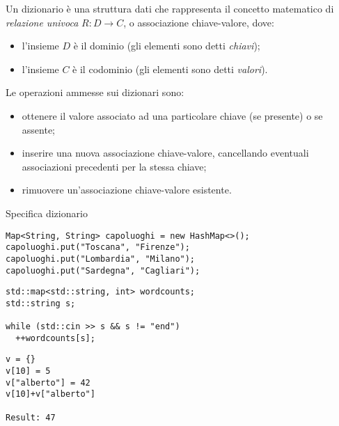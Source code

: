 Un dizionario è una struttura dati che rappresenta il concetto matematico di \emph{relazione univoca} \(R : D \to C\), o associazione chiave-valore, dove:
\begin{itemize}
	\item l'insieme \(D\) è il dominio (gli elementi sono detti \emph{chiavi});
	\item l'insieme \(C\) è il codominio (gli elementi sono detti \emph{valori}).
\end{itemize}

Le operazioni ammesse sui dizionari sono:
\begin{itemize}
	\item ottenere il valore associato ad una particolare chiave (se presente) o \Nil se assente;
	\item inserire una nuova associazione chiave-valore, cancellando eventuali associazioni precedenti per la stessa chiave;
	\item rimuovere un'associazione chiave-valore esistente.
\end{itemize}

\begin{algorithm}[H]
\caption*{Specifica dizionario}

\end{algorithm}

\begin{code}
\begin{verbatim}
Map<String, String> capoluoghi = new HashMap<>();
capoluoghi.put("Toscana", "Firenze");
capoluoghi.put("Lombardia", "Milano");
capoluoghi.put("Sardegna", "Cagliari");
\end{verbatim}
\end{code}

\begin{code}
\begin{verbatim}
std::map<std::string, int> wordcounts;
std::string s;

while (std::cin >> s && s != "end")
  ++wordcounts[s];
\end{verbatim}
\end{code}

\begin{code}
\begin{verbatim}
v = {}
v[10] = 5
v["alberto"] = 42
v[10]+v["alberto"]

Result: 47
\end{verbatim}
\end{code}

